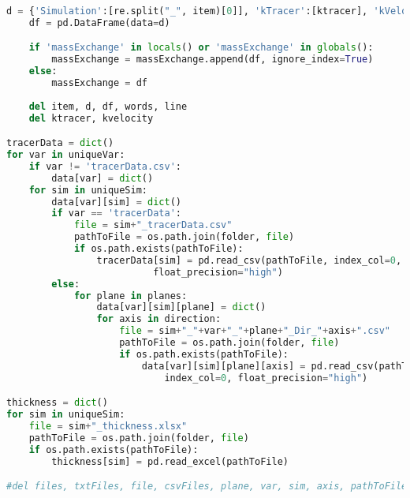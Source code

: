 \begin{lstlisting}[language=python]
    d = {'Simulation':[re.split("_", item)[0]], 'kTracer':[ktracer], 'kVelocity':[kvelocity]}
    df = pd.DataFrame(data=d)

    if 'massExchange' in locals() or 'massExchange' in globals():
        massExchange = massExchange.append(df, ignore_index=True)
    else:
        massExchange = df
        
    del item, d, df, words, line
    del ktracer, kvelocity

tracerData = dict()
for var in uniqueVar:
    if var != 'tracerData.csv':
        data[var] = dict()
    for sim in uniqueSim:
        data[var][sim] = dict()
        if var == 'tracerData':
            file = sim+"_tracerData.csv"
            pathToFile = os.path.join(folder, file)
            if os.path.exists(pathToFile):
                tracerData[sim] = pd.read_csv(pathToFile, index_col=0,
                          float_precision="high")
        else:
            for plane in planes:
                data[var][sim][plane] = dict()
                for axis in direction:
                    file = sim+"_"+var+"_"+plane+"_Dir_"+axis+".csv"
                    pathToFile = os.path.join(folder, file)
                    if os.path.exists(pathToFile):
                        data[var][sim][plane][axis] = pd.read_csv(pathToFile,\
                            index_col=0, float_precision="high")

thickness = dict()
for sim in uniqueSim:
    file = sim+"_thickness.xlsx"
    pathToFile = os.path.join(folder, file)
    if os.path.exists(pathToFile):
        thickness[sim] = pd.read_excel(pathToFile)

#del files, txtFiles, file, csvFiles, plane, var, sim, axis, pathToFile, direction

\end{lstlisting}

